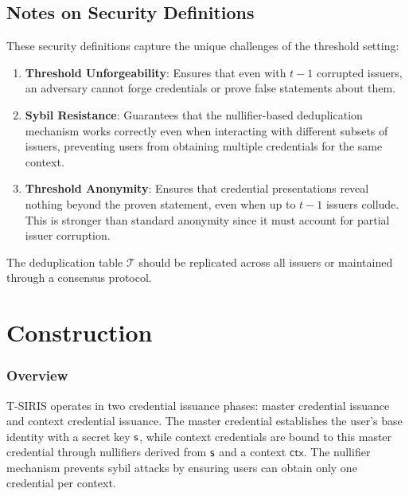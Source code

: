 \subsection{Notes on Security Definitions}

These security definitions capture the unique challenges of the threshold setting:

\begin{enumerate}
    \item \textbf{Threshold Unforgeability}: Ensures that even with $t-1$ corrupted issuers, an adversary cannot forge credentials or prove false statements about them.

    \item \textbf{Sybil Resistance}: Guarantees that the nullifier-based deduplication mechanism works correctly even when interacting with different subsets of issuers, preventing users from obtaining multiple credentials for the same context.

    \item \textbf{Threshold Anonymity}: Ensures that credential presentations reveal nothing beyond the proven statement, even when up to $t-1$ issuers collude. This is stronger than standard anonymity since it must account for partial issuer corruption.
\end{enumerate}

The deduplication table $\mathcal{T}$ should be replicated across all issuers or maintained through a consensus protocol.


















\section{Construction}

\subsubsection{Overview}
T-SIRIS operates in two credential issuance phases: master credential issuance and context credential issuance. The master credential establishes the user's base identity with a secret key $\mathsf{s}$, while context credentials are bound to this master credential through nullifiers derived from $\mathsf{s}$ and a context $\mathsf{ctx}$. The nullifier mechanism prevents sybil attacks by ensuring users can obtain only one credential per context.


